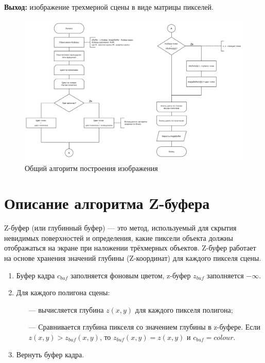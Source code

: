 \textbf{Выход:} изображение трехмерной сцены в виде матрицы пикселей.

\begin{figure}[H]
    \centering
    \includegraphics[width=1\linewidth]{images/diograms/gen_alg.png}
    \caption{Общий алгоритм построения изображения}
    \label{fig:gen_alg}
\end{figure}

\section{Описание алгоритма Z-буфера}

Z-буфер (или глубинный буфер) — это метод, используемый для скрытия невидимых поверхностей и определения, какие пиксели объекта должны отображаться на экране при наложении трёхмерных объектов. Z-буфер работает на основе хранения значений глубины (Z-координат) для каждого пикселя сцены.

\begin{enumerate}
    \item Буфер кадра $c_{buf}$ заполняется фоновым цветом, z-буфер $z_{buf}$ заполняется $-\infty$.
    \item Для каждого полигона сцены:
    \begin{itemize}
        \item[---] вычисляется глубина $z(x,y)$ для каждого пикселя полигона;
        \item[---] Сравнивается глубина пикселя со значением глубины в z-буфере. Если $z(x,y) > z_{buf}(x,y)$, то $z_{buf}(x,y) = z(x,y)$ и $c_{buf} = colour$.
    \end{itemize}
    \item Вернуть буфер кадра.
\end{enumerate}

